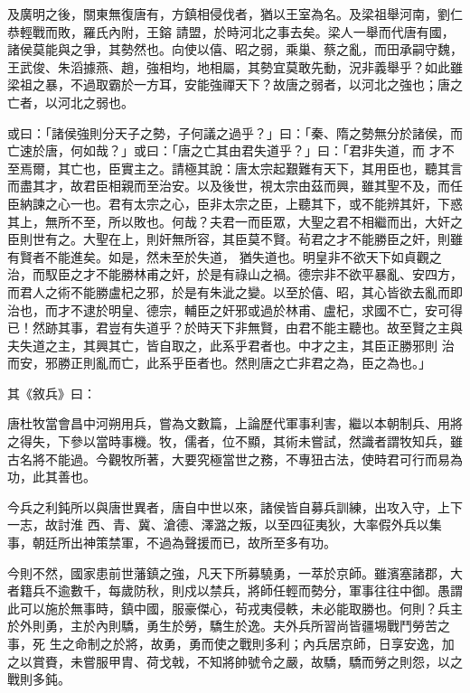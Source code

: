 \begin{pinyinscope}
 及廣明之後，關東無復唐有，方鎮相侵伐者，猶以王室為名。及梁祖舉河南，劉仁恭輕戰而敗，羅氏內附，王鎔
 請盟，於時河北之事去矣。梁人一舉而代唐有國，諸侯莫能與之爭，其勢然也。向使以僖、昭之弱，乘巢、蔡之亂，而田承嗣守魏，王武俊、朱滔據燕、趙，強相均，地相屬，其勢宜莫敢先動，況非義舉乎？如此雖梁祖之暴，不過取霸於一方耳，安能強禪天下？故唐之弱者，以河北之強也；唐之亡者，以河北之弱也。



 或曰：「諸侯強則分天子之勢，子何議之過乎？」曰：「秦、隋之勢無分於諸侯，而亡速於唐，何如哉？」或曰：「唐之亡其由君失道乎？」曰：「君非失道，而
 才不至焉爾，其亡也，臣實主之。請極其說：唐太宗起艱難有天下，其用臣也，聽其言而盡其才，故君臣相親而至治安。以及後世，視太宗由茲而興，雖其聖不及，而任臣納諫之心一也。君有太宗之心，臣非太宗之臣，上聽其下，或不能辨其奸，下惑其上，無所不至，所以敗也。何哉？夫君一而臣眾，大聖之君不相繼而出，大奸之臣則世有之。大聖在上，則奸無所容，其臣莫不賢。茍君之才不能勝臣之奸，則雖有賢者不能進矣。如是，然未至於失道，
 猶失道也。明皇非不欲天下如貞觀之治，而馭臣之才不能勝林甫之奸，於是有祿山之禍。德宗非不欲平暴亂、安四方，而君人之術不能勝盧杞之邪，於是有朱泚之變。以至於僖、昭，其心皆欲去亂而即治也，而才不逮於明皇、德宗，輔臣之奸邪或過於林甫、盧杞，求國不亡，安可得已！然跡其事，君豈有失道乎？於時天下非無賢，由君不能主聽也。故至賢之主與夫失道之主，其興其亡，皆自取之，此系乎君者也。中才之主，其臣正勝邪則
 治而安，邪勝正則亂而亡，此系乎臣者也。然則唐之亡非君之為，臣之為也。」



 其《敘兵》曰：



 唐杜牧當會昌中河朔用兵，嘗為文數篇，上論歷代軍事利害，繼以本朝制兵、用將之得失，下參以當時事機。牧，儒者，位不顯，其術未嘗試，然識者謂牧知兵，雖古名將不能過。今觀牧所著，大要究極當世之務，不專狃古法，使時君可行而易為功，此其善也。



 今兵之利鈍所以與唐世異者，唐自中世以來，諸侯皆自募兵訓練，出攻入守，上下一志，故討淮
 西、青、冀、滄德、澤潞之叛，以至四征夷狄，大率假外兵以集事，朝廷所出神策禁軍，不過為聲援而已，故所至多有功。



 今則不然，國家患前世藩鎮之強，凡天下所募驍勇，一萃於京師。雖濱塞諸郡，大者籍兵不逾數千，每歲防秋，則戍以禁兵，將師任輕而勢分，軍事往往中御。愚謂此可以施於無事時，鎮中國，服豪傑心，茍戎夷侵軼，未必能取勝也。何則？兵主於外則勇，主於內則驕，勇生於勞，驕生於逸。夫外兵所習尚皆疆埸戰鬥勞苦之事，死
 生之命制之於將，故勇，勇而使之戰則多利；內兵居京師，日享安逸，加之以賞賚，未嘗服甲胄、荷戈戟，不知將帥號令之嚴，故驕，驕而勞之則怨，以之戰則多鈍。




\end{pinyinscope}
